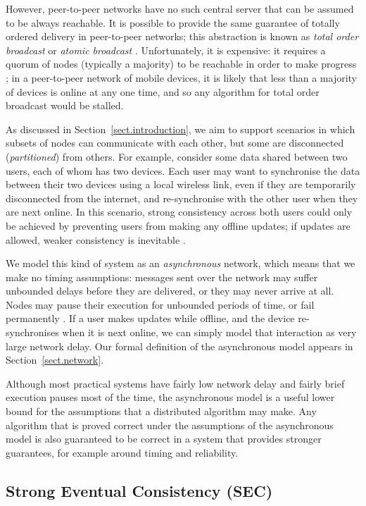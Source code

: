 However, peer-to-peer networks have no such central server that can be assumed to be always
reachable. It is possible to provide the same guarantee of totally ordered delivery in peer-to-peer
networks; this abstraction is known as \emph{total order broadcast} or \emph{atomic broadcast}
\cite{Cachin:2011wt,Defago:2004ji}. Unfortunately, it is expensive: it requires a quorum of nodes
(typically a majority) to be reachable in order to make progress \cite{Chandra:1996cp}; in a
peer-to-peer network of mobile devices, it is likely that less than a majority of devices is online
at any one time, and so any algorithm for total order broadcast would be stalled.

As discussed in Section~\ref{sect.introduction}, we aim to support scenarios in which subsets of
nodes can communicate with each other, but some are disconnected (\emph{partitioned}) from others.
For example, consider some data shared between two users, each of whom has two devices. Each user
may want to synchronise the data between their two devices using a local wireless link, even if they
are temporarily disconnected from the internet, and re-synchronise with the other user when they are
next online. In this scenario, strong consistency across both users could only be achieved by
preventing users from making any offline updates; if updates are allowed, weaker consistency is
inevitable \cite{Attiya:2015dm,Davidson:1985hv}.

We model this kind of system as an \emph{asynchronous} network, which means that we make no timing
assumptions: messages sent over the network may suffer unbounded delays before they are delivered,
or they may never arrive at all. Nodes may pause their execution for unbounded periods of time, or
fail permanently \cite{Cachin:2011wt}. If a user makes updates while offline, and the device
re-synchronises when it is next online, we can simply model that interaction as very large network
delay. Our formal definition of the asynchronous model appears in Section~\ref{sect.network}.

Although most practical systems have fairly low network delay and fairly brief execution pauses most
of the time, the asynchronous model is a useful lower bound for the assumptions that a distributed
algorithm may make. Any algorithm that is proved correct under the assumptions of the asynchronous
model is also guaranteed to be correct in a system that provides stronger guarantees, for example
around timing and reliability.

\subsection{Strong Eventual Consistency (SEC)}\label{sect.eventual.consistency}

